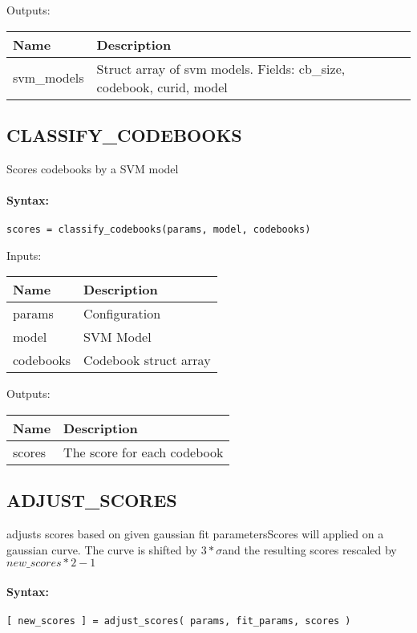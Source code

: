 \bigskip
Outputs:

\begin{tabular}{|p{}|p{}|}
\hline
\textbf{Name} & \textbf{Description} \\
\hline \hline
svm\_models & Struct array of svm models. Fields: cb\_size, codebook, curid, model  \\ \hline
\end{tabular}

\subsection{CLASSIFY\_CODEBOOKS}

Scores codebooks by a SVM model

\paragraph{Syntax:} \verb|scores = classify_codebooks(params, model, codebooks)|

\bigskip
Inputs:

\begin{tabular}{|p{}|p{}|}
\hline
\textbf{Name} & \textbf{Description} \\
\hline \hline
params & Configuration  \\ \hline
model & SVM Model  \\ \hline
codebooks & Codebook struct array  \\ \hline
\end{tabular}

\bigskip
Outputs:

\begin{tabular}{|p{}|p{}|}
\hline
\textbf{Name} & \textbf{Description} \\
\hline \hline
scores & The score for each codebook  \\ \hline
\end{tabular}

\subsection{ADJUST\_SCORES}

adjusts scores based on given gaussian fit parametersScores will applied on a gaussian curve. The curve is shifted by $3 * \sigma$and the resulting scores rescaled by $new\_scores * 2 - 1$

\paragraph{Syntax:} \verb|[ new_scores ] = adjust_scores( params, fit_params, scores )|

